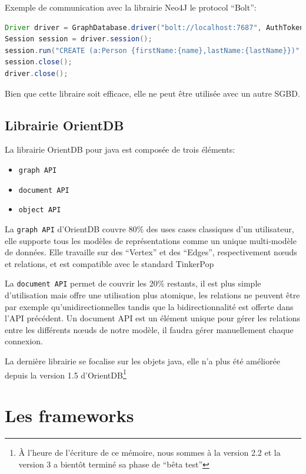 \documentclass[a4paper,fleqn,12pt]{report}
\begin{document}
Exemple de communication avec la librairie Neo4J le protocol \enquote{Bolt}:

\begin{lstlisting}[language=java]
Driver driver = GraphDatabase.driver("bolt://localhost:7687", AuthTokens.basic("matrix", "neo"));
Session session = driver.session();
session.run("CREATE (a:Person {firstName:{name},lastName:{lastName}})", parameters("firstName","Gilles","lastName","Bodart"));
session.close();
driver.close();

\end{lstlisting}

Bien que cette libraire soit efficace, elle ne peut être utilisée avec un autre SGBD. 

\subsection{Librairie OrientDB}

La librairie OrientDB pour java est composée de trois éléments:

\begin{itemize}
\item \texttt{graph API}
\item \texttt{document API}
\item \texttt{object API}
\end{itemize}

La \texttt{graph API} d’OrientDB couvre 80\% des uses cases classiques d’un utilisateur, elle supporte tous les modèles de représentations comme un unique multi-modèle de données. Elle travaille sur des \enquote{Vertex} et des \enquote{Edges}, respectivement nœuds et relations, et est compatible avec le standard TinkerPop

La \texttt{document API} permet de couvrir les 20\% restants, il est plus simple d’utilisation mais offre une utilisation plus atomique, les relations ne peuvent être par exemple qu’unidirectionnelles tandis que la bidirectionnalité est offerte dans l’API précédent. Un document API est un élément unique pour gérer les relations entre les différents nœuds de notre modèle, il faudra gérer manuellement chaque connexion.

La dernière librairie se focalise sur les objets java, elle n'a plus été améliorée depuis la version 1.5 d'OrientDB\footnote{À l'heure de l'écriture de ce mémoire, nous sommes à la version 2.2 et la version 3 a bientôt terminé sa phase de \enquote{bêta test}}

\section{Les frameworks}
\end{document}
